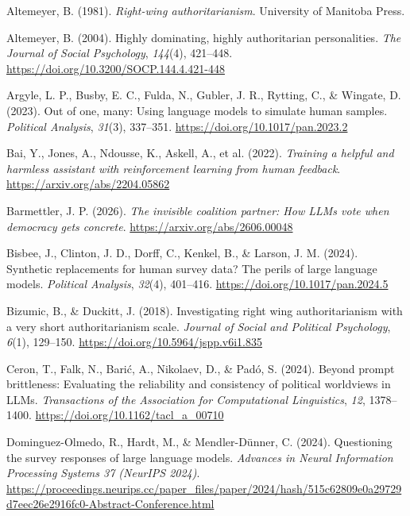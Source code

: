 \documentclass[
]{article}
\newlength{\cslhangindent}
\newenvironment{CSLReferences}[2] %
 {\begin{list}{}{%
  \setlength{\itemindent}{0pt}
  \setlength{\leftmargin}{0pt}
  \setlength{\parsep}{0pt}
  \ifodd #1
   \setlength{\leftmargin}{\cslhangindent}
   \setlength{\itemindent}{-1\cslhangindent}
  \fi
  \setlength{\itemsep}{#2\baselineskip}}}
 {\end{list}}
\begin{document}
\protect{}\label{refs}
\begin{CSLReferences}{1}{0}
Altemeyer, B. (1981). \emph{Right-wing authoritarianism}. University of
Manitoba Press.

Altemeyer, B. (2004). Highly dominating, highly authoritarian
personalities. \emph{The Journal of Social Psychology}, \emph{144}(4),
421--448. \url{https://doi.org/10.3200/SOCP.144.4.421-448}

Argyle, L. P., Busby, E. C., Fulda, N., Gubler, J. R., Rytting, C., \&
Wingate, D. (2023). Out of one, many: Using language models to simulate
human samples. \emph{Political Analysis}, \emph{31}(3), 337--351.
\url{https://doi.org/10.1017/pan.2023.2}

{Bai, Y., Jones, A., Ndousse, K., Askell, A., et al.} (2022).
\emph{Training a helpful and harmless assistant with reinforcement
learning from human feedback}. \url{https://arxiv.org/abs/2204.05862}

Barmettler, J. P. (2026). \emph{The invisible coalition partner: How
{LLMs} vote when democracy gets concrete}.
\url{https://arxiv.org/abs/2606.00048}

Bisbee, J., Clinton, J. D., Dorff, C., Kenkel, B., \& Larson, J. M.
(2024). Synthetic replacements for human survey data? {The} perils of
large language models. \emph{Political Analysis}, \emph{32}(4),
401--416. \url{https://doi.org/10.1017/pan.2024.5}

Bizumic, B., \& Duckitt, J. (2018). Investigating right wing
authoritarianism with a very short authoritarianism scale. \emph{Journal
of Social and Political Psychology}, \emph{6}(1), 129--150.
\url{https://doi.org/10.5964/jspp.v6i1.835}

Ceron, T., Falk, N., Barić, A., Nikolaev, D., \& Padó, S. (2024). Beyond
prompt brittleness: Evaluating the reliability and consistency of
political worldviews in {LLMs}. \emph{Transactions of the Association
for Computational Linguistics}, \emph{12}, 1378--1400.
\url{https://doi.org/10.1162/tacl_a_00710}

Dominguez-Olmedo, R., Hardt, M., \& Mendler-Dünner, C. (2024).
Questioning the survey responses of large language models.
\emph{Advances in Neural Information Processing Systems 37 (NeurIPS
2024)}.
\url{https://proceedings.neurips.cc/paper_files/paper/2024/hash/515c62809e0a29729d7eec26e2916fc0-Abstract-Conference.html}


\end{CSLReferences}
\end{document}
